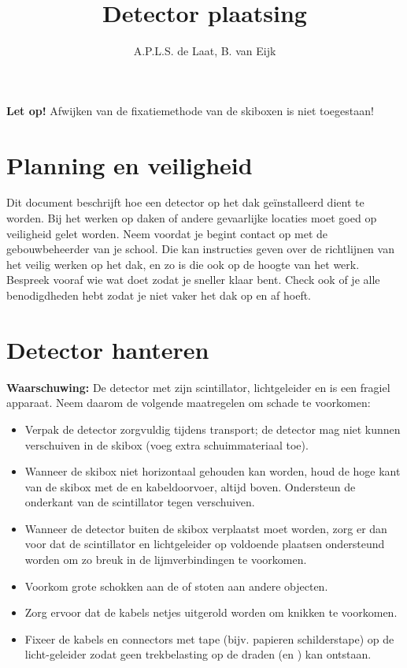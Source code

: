 

\title{Detector plaatsing}
\author{A.P.L.S. de Laat, B. van Eijk} 



\maketitle

\textbf{Let op!} Afwijken van de fixatiemethode van de skiboxen is niet
toegestaan!


\section{Planning en veiligheid}

Dit document beschrijft hoe een \hisparc detector op het dak
geïnstalleerd dient te worden. Bij het werken op daken of andere
gevaarlijke locaties moet goed op veiligheid gelet worden. Neem voordat
je begint contact op met de gebouwbeheerder van je school. Die kan
instructies geven over de richtlijnen van het veilig werken op het dak,
en zo is die ook op de hoogte van het werk. Bespreek vooraf wie wat doet
zodat je sneller klaar bent. Check ook of je alle benodigdheden hebt
zodat je niet vaker het dak op en af hoeft.


\section{Detector hanteren}

\textbf{Waarschuwing:} De \hisparc detector met zijn scintillator,
lichtgeleider en \pmt is een fragiel apparaat. Neem daarom de volgende
maatregelen om schade te voorkomen:

\begin{itemize}
    \item Verpak de detector zorgvuldig tijdens transport; de detector
    mag niet kunnen verschuiven in de skibox (voeg extra schuimmateriaal
    toe).
    \item Wanneer de skibox niet horizontaal gehouden kan worden, houd
    de hoge kant van de skibox met de \pmt en kabeldoorvoer, altijd
    boven. Ondersteun de onderkant van de scintillator tegen verschuiven.
    \item Wanneer de detector buiten de skibox verplaatst moet worden,
    zorg er dan voor dat de scintillator en lichtgeleider op voldoende
    plaatsen ondersteund worden om zo breuk in de lijmverbindingen te
    voorkomen.
    \item Voorkom grote schokken aan de \pmt of stoten aan andere
    objecten.
    \item Zorg ervoor dat de kabels netjes uitgerold worden om knikken
    te voorkomen.
    \item Fixeer de \pmt kabels en connectors met tape (bijv. papieren
    schilderstape) op de licht-geleider zodat geen trekbelasting op de
    draden (en \pmt) kan ontstaan.
\end{itemize}


